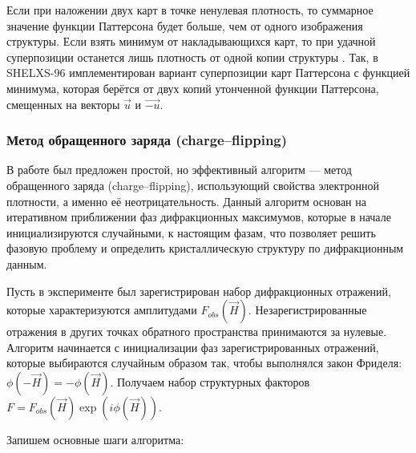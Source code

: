 Если при наложении двух карт в точке ненулевая плотность, то суммарное значение функции Паттерсона будет больше, чем от одного изображения структуры. Если взять минимум от накладывающихся карт, то при удачной суперпозиции останется лишь плотность от одной копии структуры \cite{pavelcik_patterson-oriented_1992}. Так, в SHELXS-96 \cite{sheldrick_patterson_1997} имплементирован вариант суперпозиции карт Паттерсона с функцией минимума, которая берётся от двух копий утонченной функции Паттерсона, смещенных на векторы $\overrightarrow{u}$ и $\overrightarrow{-u}$.
	

\subsubsection{Метод обращенного заряда (charge--flipping)}

В работе \cite{oszlanyi_ab_2004} был предложен простой, но эффективный алгоритм --- метод обращенного заряда (charge--flipping), использующий свойства электронной плотности, а именно её неотрицательность. Данный алгоритм основан на итеративном приближении фаз дифракционных максимумов, которые в начале инициализируются случайными, к настоящим фазам, что позволяет решить фазовую проблему и определить кристаллическую структуру по дифракционным данным. 

Пусть в эксперименте был зарегистрирован набор дифракционных отражений, которые характеризуются амплитудами $F_{obs}(\overrightarrow{H})$. Незарегистрированные отражения в других точках обратного пространства принимаются за нулевые. Алгоритм начинается с инициализации фаз зарегистрированных отражений, которые выбираются случайным образом так, чтобы выполнялся закон Фриделя: $\phi(-\overrightarrow{H}) = -\phi(\overrightarrow{H})$. Получаем набор структурных факторов $F = F_{obs}(\overrightarrow{H})\exp(i\phi(\overrightarrow{H}))$.

Запишем основные шаги алгоритма:

